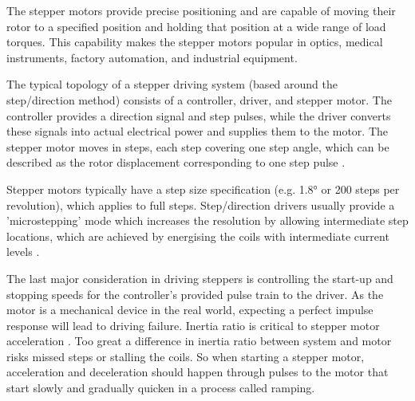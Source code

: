 The stepper motors provide precise positioning and are capable of moving their rotor to a specified position and holding that position at a wide range of load torques. This capability makes the stepper motors popular in optics, medical instruments, factory automation, and industrial equipment.

The typical topology of a stepper driving system (based around the step/direction method) consists of a controller, driver, and stepper motor. The controller provides a direction signal and step pulses, while the driver converts these signals into actual electrical power and supplies them to the motor. The stepper motor moves in steps, each step covering one step angle, which can be described as the rotor displacement corresponding to one step pulse \cite{step_app}.

Stepper motors typically have a step size specification (e.g. 1.8° or 200 steps per revolution), which applies to full steps. Step/direction drivers usually provide a 'microstepping' mode which increases the resolution by allowing intermediate step locations, which are achieved by energising the coils with intermediate current levels \cite{step_book}.

The last major consideration in driving steppers is controlling the start-up and stopping speeds for the controller's provided pulse train to the driver. As the motor is a mechanical device in the real world, expecting a perfect impulse response will lead to driving failure. Inertia ratio is critical to stepper motor acceleration \cite{step_book}. Too great a difference in inertia ratio between system and motor risks missed steps or stalling the coils. So when starting a stepper motor, acceleration and deceleration should happen through pulses to the motor that start slowly and gradually quicken in a process called ramping.

